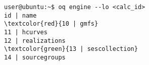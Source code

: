 \begin{Verbatim}[frame=single, commandchars=\\\{\}, fontsize=\small]
user@ubuntu:~$ oq engine --lo <calc_id>
id | name
\textcolor{red}{10 | gmfs}
11 | hcurves
12 | realizations
\textcolor{green}{13 | sescollection}
14 | sourcegroups
\end{Verbatim}